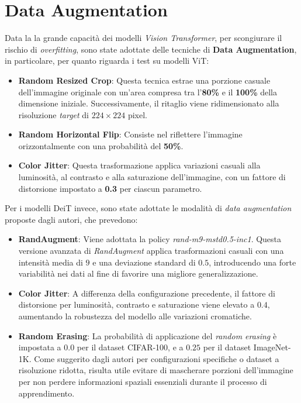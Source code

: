 \section{Data Augmentation}
Data la la grande capacità dei modelli \textit{Vision Transformer}, per
scongiurare il rischio di \textit{overfitting}, sono state adottate delle
tecniche di \textbf{Data Augmentation}, in particolare, per quanto riguarda i
test su modelli ViT:
\begin{itemize}
    \item \textbf{Random Resized Crop}: Questa tecnica estrae una porzione casuale dell'immagine originale con un'area compresa tra l'\textbf{80\%} e il \textbf{100\%} della dimensione iniziale. Successivamente, il ritaglio viene ridimensionato alla risoluzione \textit{target} di \textbf{$224 \times 224$} pixel.
    \item \textbf{Random Horizontal Flip}: Consiste nel riflettere l'immagine orizzontalmente con una probabilità del \textbf{50\%}.
    \item \textbf{Color Jitter}: Questa trasformazione applica variazioni casuali alla luminosità, al contrasto e alla saturazione dell'immagine, con un fattore di distorsione impostato a \textbf{0.3} per ciascun parametro.
\end{itemize}
Per i modelli DeiT invece, sono state adottate le modalità di \textit{data augmentation} proposte dagli autori\cite{touvron2021trainingdataefficientimagetransformers}, che prevedono:
\begin{itemize}
    \item \textbf{RandAugment}: Viene adottata la policy \textit{rand-m9-mstd0.5-inc1}. Questa versione avanzata di \textit{RandAugment} applica trasformazioni casuali con una intensità media di $9$ e una deviazione standard di $0.5$, introducendo una  forte variabilità nei dati al fine di favorire una migliore generalizzazione.
    \item \textbf{Color Jitter}: A differenza della configurazione precedente, il fattore di distorsione per luminosità, contrasto e saturazione viene elevato a $0.4$, aumentando la robustezza del modello alle variazioni cromatiche.
    \item \textbf{Random Erasing}: La probabilità di applicazione del \textit{random erasing} è impostata a $0.0$ per il dataset CIFAR-100, e a $0.25$ per il dataset ImageNet-1K. Come suggerito dagli autori per configurazioni specifiche o dataset a risoluzione ridotta, risulta utile evitare di mascherare porzioni dell'immagine per non perdere informazioni spaziali essenziali durante il processo di apprendimento.
\end{itemize}

